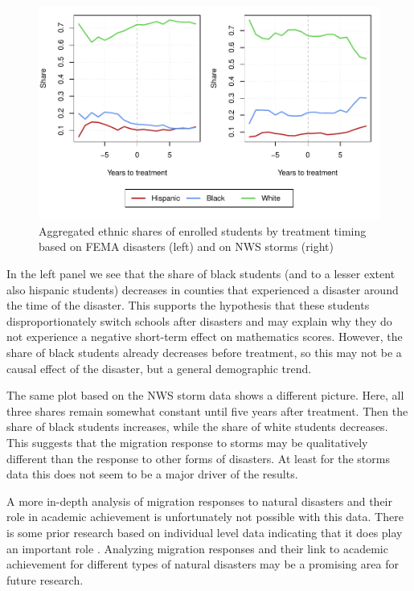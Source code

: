 \begin{figure}[!h]
	\centering
	\includegraphics[scale=1]{"../Code & Data/EthnicComposition.pdf"}
	\caption{Aggregated ethnic shares of enrolled students by treatment timing based on FEMA disasters (left) and on NWS storms (right)}
	\label{EthnicComposition}
\end{figure}

In the left panel we see that the share of black students (and to a lesser extent also hispanic students) decreases in counties that experienced a disaster around the time of the disaster. This supports the hypothesis that these students disproportionately switch schools after disasters and may explain why they do not experience a negative short-term effect on mathematics scores. However, the share of black students already decreases before treatment, so this may not be a causal effect of the disaster, but a general demographic trend.

The same plot based on the NWS storm data shows a different picture. Here, all three shares remain somewhat constant until five years after treatment. Then the share of black students increases, while the share of white students decreases. This suggests that the migration response to storms may be qualitatively different than the response to other forms of disasters. At least for the storms data this does not seem to be a major driver of the results.

A more in-depth analysis of migration responses to natural disasters and their role in academic achievement is unfortunately not possible with this data. There is some prior research based on individual level data indicating that it does play an important role \citep[for example][]{Sacerdote_2012}. Analyzing migration responses and their link to academic achievement for different types of natural disasters may be a promising area for future research.


